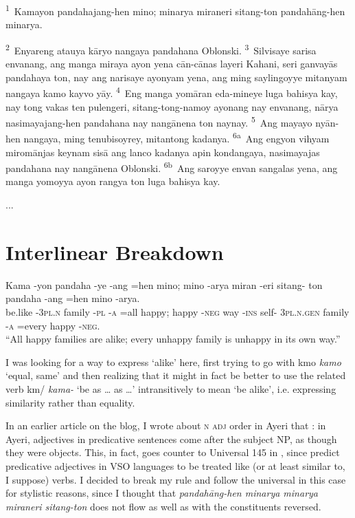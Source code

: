 \documentclass[12pt,paper=letter]{scrartcl}
\newcommand{\fw}[1]{\textit{#1}} %
\newcommand{\q}[1]{\enquote{#1}} %
\newcommand{\qq}[1]{\enquote*{#1}} %
\newcommand{\tsup}[1]{\textsuperscript{#1}} %
\newcommand{\mor}[1]{\textsc{\lowercase{#1}}}
\newcommand{\ayr}[1]{{\Tagati #1}}
\begin{document}
\noindent
\tsup{1}~Kamayon pandahajang-hen mino; minarya miraneri sitang-ton 
    pandahāng-hen minarya.

\tsup{2}~Enyareng atauya kāryo nangaya pandahana Oblonski.
\tsup{3}~Silvisaye sarisa envanang, ang manga miraya ayon yena cān-cānas layeri 
    Kahani, seri ganvayās pandahaya ton, nay ang narisaye ayonyam yena, ang 
    ming saylingoyye mitanyam nangaya kamo kayvo yāy.
\tsup{4}~Eng manga yomāran eda-mineye luga bahisya kay, nay tong vakas ten 
    pulengeri, sitang-tong-namoy ayonang nay envanang, nārya nasimayajang-hen 
    pandahana nay nangānena ton naynay.
\tsup{5}~Ang mayayo nyān-hen nangaya, ming tenubisoyrey, mitantong kadanya.
\tsup{6a}~Ang engyon vihyam miromānjas keynam sisā ang lanco kadanya apin 
    kondangaya, nasimayajas pandahana nay nangānena Oblonski.
\tsup{6b}~Ang saroyye envan sangalas yena, ang manga yomoyya ayon rangya ton 
    luga bahisya kay.

...

\section{Interlinear Breakdown}

\begin{exe} %
    \ex \label{ex:1}
    \gll Kama -yon pandaha -ye -ang =hen mino; mino -arya miran -eri sitang- ton 
	pandaha -ang =hen mino -arya. \\
    be.like \mor{-3PL.N} family \mor{-PL} \mor{-A} =all happy; happy \mor{-NEG} 
	way \mor{-INS} self- \mor{3PL.N.GEN} family \mor{-A} =every happy
	\mor{-NEG}. \\
    \glt \q{All happy families are alike; every unhappy family is unhappy 
	in its own way.}
\end{exe}

I was looking for a way to express \qq{alike} here, first trying to go with
\ayr{kmo} \fw{kamo} \qq{equal, same} and then realizing that it might in fact
be better to use the related verb \ayr{km/} \fw{kama-} \qq{be as … as …}
intransitively to mean \qq{be alike}, i.e. expressing similarity rather than 
equality.

In an earlier article on the blog, I wrote about \mor{N ADJ} order in Ayeri that
: in Ayeri, adjectives in predicative sentences come after
the subject NP, as though they were objects. This, in fact, goes counter to 
Universal 145 in  \autocite{universalsarchive},
since \citeauthor{universalsarchive} predict predicative adjectives in VSO 
languages to be treated like (or at least similar to, I suppose) verbs. I 
decided to break my rule and follow the universal in this case for stylistic 
reasons, since I thought that \fw{pandahāng-hen minarya minarya miraneri 
sitang-ton} does not flow as well as with the constituents reversed.
\end{document}
